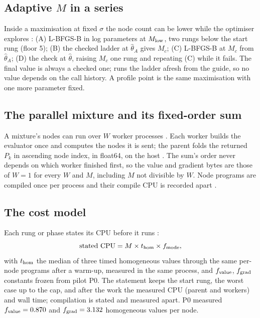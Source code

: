\subsection{Adaptive $M$ in a series}\label{sec:het-adaptive}

Inside a maximisation at fixed $\sigma$ the node count can be lower while the optimiser explores
: (A) L-BFGS-B in log parameters at $M_{\rm low}$, two rungs below the start
rung (floor 5); (B) the checked ladder at $\hat\theta_A$ gives $M_c$; (C) L-BFGS-B at $M_c$ from $\hat\theta_A$;
(D) the check at $\hat\theta$, raising $M_c$ one rung and repeating (C) while it fails. The final value is always a
checked one;  runs the ladder afresh from the guide, so no value depends on the
call history. A profile point is the same maximisation with one more parameter fixed.

\subsection{The parallel mixture and its fixed-order sum}\label{sec:het-pool}

A mixture's nodes can run over $W$ worker processes . Each worker builds the evaluator
once and computes the nodes it is sent; the parent folds the returned $P_k$ in ascending node index, in float64, on the
host . The sum's order never depends on which worker finished first, so the value and
gradient bytes are those of $W=1$ for every $W$ and $M$, including $M$ not divisible by $W$. Node programs are compiled
once per process and their compile CPU is recorded apart .

\subsection{The cost model}\label{sec:het-cost}

Each rung or phase states its CPU before it runs :
\begin{equation}
  \text{stated CPU}=M\times t_{\rm hom}\times f_{\rm mode},
\end{equation}
with $t_{\rm hom}$ the median of three timed homogeneous values through the same per-node programs after a warm-up,
measured in the same process, and $f_{\rm value}$, $f_{\rm grad}$ constants frozen from pilot P0. The statement keeps
the start rung, the worst case up to the cap, and after the work the measured CPU (parent and workers) and wall time;
compilation is stated and measured apart. P0 measured
$f_{\rm value}=\verify{tests/acceptance/results/p0_het_cost_004.json}{f_value}{.3f}{0.870}$ and
$f_{\rm grad}=\verify{tests/acceptance/results/p0_het_cost_004.json}{f_grad}{.3f}{3.132}$ homogeneous values per
node.

